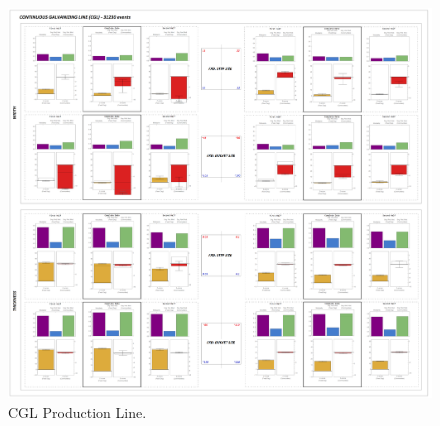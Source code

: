 \begin{landscape}
	\begin{figure}[ht]
		\centering
		\includegraphics[width=1.1\textwidth]{../images/supplements-CGL_real_life_events_analysis-results.png}
		\caption{CGL Production Line.}
		\label{figure-supplements-CGL}
	\end{figure}
\end{landscape}